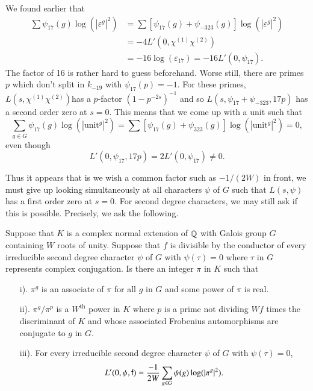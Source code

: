 We found earlier that 
\begin{align*}
\sum \psi_{17} (g) \log (|\varepsilon^g|^2) & =  \sum [\psi_{17}  (g) + \psi_{-323} (g) ]   \log (|\varepsilon^g|^2)\\
& = -4 L' (0, \chi^{(1)} \chi^{(2)})\\
& = -16 \log (\varepsilon_{17}) = -16 L' (0,\psi_{17}).
\end{align*}
The factor of 16 is rather hard to guess beforehand. Worse still, there are primes $p$ which don't split in $k_{-19}$ with $\psi_{17} (p) = -1$. For these primes, $L(s, \chi^{(1)} \chi^{(2)})$\pageoriginale has a $p$-factor $(1-p^{-2s})^{-1}$ and so $L(s, \psi_{17} + \psi_{-323}, 17p)$ has a second order zero at $s =0$. This means that we come up with a unit such that 
$$
\sum\limits_{g \in G} \psi_{17} (g) \log (|\text{unit}^g|^2) = \sum [\psi_{17} (g) + \psi_{323} (g)]   \log (|\text{unit}^g|^2) = 0,
$$
even though
$$
L' (0, \psi_{17}, 17p) = 2 L' (0,\psi_{17}) \neq 0.
$$

Thus it appears that is we wish a common factor such as $-1 /(2W)$ in front, we must give up looking simultaneously at all characters $\psi$ of $G$ such that $L(s, \psi)$ has a first order zero at $s =0$. For second degree characters, we may still ask if this is possible. Precisely, we ask the following.

\begin{question*}
Suppose that $K$ is a complex normal extension of $\mathbb{Q}$ with Galois group $G$ containing $W$ roots of unity. Suppose that $f$ is divisible by the conductor of every irreducible second degree character $\psi$ of $G$ with $\psi(\tau) =0$ where $\tau$ in $G$ represents complex conjugation. Is there an integer $\pi$ in $K$ such that 
\begin{itemize}
\item[i).] $\pi^g$ is an associate of $\pi$ for all $g$ in $G$ and some power of $\pi$ is real. 

\item[ii).] $\pi^g/ \pi^p$ is a $W^{\text{th}}$ power in $K$ where $p$ is a prime not dividing $Wf$ times the discriminant of $K$ and whose associated Frobenius automorphisms are conjugate to $g$ in $G$.

\item[iii).] For every irreducible second degree character $\psi$ of $G$ with $\psi (\tau) = 0$, 
$$
L' (0, \psi, \mathsf{f}) = \frac{-1}{2 W} \sum\limits_{g \in G} \psi (g) \log (|\pi^g|^2).
$$
\end{itemize}
\end{question*}

